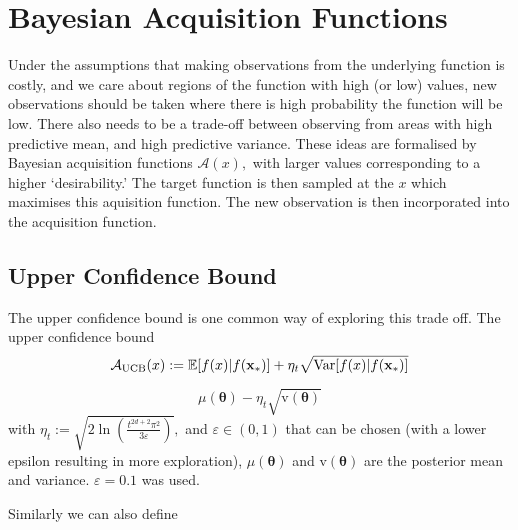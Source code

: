 \begin{figure}[htbp]
\end{figure}

\section{Bayesian Acquisition Functions}

Under the assumptions that making observations from the underlying function is
costly, and we care about regions of the function with high (or low)
values, new observations should be taken where there is high probability the
function will be low. There also needs to be a trade-off between observing from
areas with high predictive mean, and high predictive variance. These ideas are
formalised by Bayesian acquisition functions $\mathcal{A}(x),$ with larger 
values corresponding to a higher `desirability.' The target function is then 
sampled at the $x$ which maximises this aquisition function. The new 
observation is then incorporated into the acquisition function.

\subsection*{Upper Confidence Bound}

The upper confidence bound is one common way of exploring this trade off. The 
upper confidence bound
$$
    \mathcal{A}_\text{UCB}(x)
    := \operatorname{\mathbb{E}}[f(x) | f(\mathbf{x}_*)]
    + \eta_t \sqrt{\mathrm{Var}[f(x) | f(\mathbf{x}_*)]}
$$


$$\mu(\bm\theta) - \eta_t\sqrt{\mathrm{v}(\bm\theta)}$$
with $\eta_t:= \sqrt{2\ln(\frac{t^{2d + 2}\pi^2}{3\varepsilon})},$ and
$\varepsilon \in (0, 1)$ that can be chosen
(with a lower epsilon resulting in more exploration), $\mu(\bm\theta)$ and
$\mathrm{v}(\bm\theta)$ are the posterior mean and variance.
$\varepsilon = 0.1$ was used.


Similarly we can also define 

